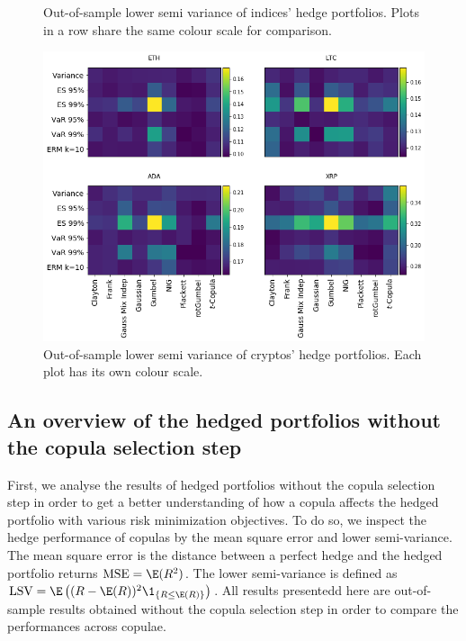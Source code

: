 \begin{landscape}
\begin{figure}[h]
\begin{minipage}[b]{0.475\linewidth}
    \caption{Out-of-sample lower semi variance of indices' hedge portfolios. Plots in a row share the same colour scale for comparison.}
  \end{minipage}
    \hfill
  \begin{minipage}[b]{0.475\linewidth}
    \centering
    \includegraphics[height=.5\linewidth]{_pics/semiVariance_cryptos.png}

    \caption{Out-of-sample lower semi variance of cryptos' hedge portfolios. Each plot has its own colour scale.}
  \end{minipage}
\end{figure}
\end{landscape}

\subsection{An overview of the hedged portfolios without the copula selection step}\label{subsec:HP1}
First, we analyse the results of hedged portfolios without the copula
selection step in order to get a better understanding of how a copula
affects the hedged portfolio with various risk minimization
objectives.
To do so, we inspect the hedge performance of copulas by
the mean square error and lower semi-variance.
The mean square error
is the distance between a perfect hedge and the hedged portfolio
returns $\operatorname{MSE}= \E(R^2)$.
The lower semi-variance is defined as
$\operatorname{LSV}=\E \left( (R-\E(R))^2 \1_{\{R\leq \E(R)\}} \right)$.
All results presentedd here are out-of-sample results obtained without
the copula selection step in order to compare the performances across
copulae.


